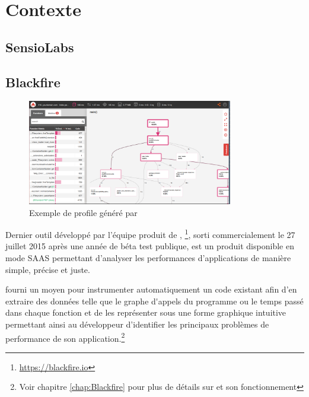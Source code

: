 \setcounter{part}{1}

\chapter{Contexte}
	\setcounter{chapter}{1}
	\section{SensioLabs}



	\section{Blackfire}

\begin{figure}[!h]
\begin{center}
    \includegraphics[width=0.8\textwidth]{images/blackfire-exemple}
  \caption{Exemple de profile généré par \Blackfire}
  \centering
\end{center}
\end{figure}

Dernier outil développé par l'équipe produit de \SensioLabs, \Blackfire\footnote{\url{https://blackfire.io}},
sorti commercialement le 27 juillet 2015 après une année de béta test publique, est un produit disponible en mode \gls{SAAS} permettant d'analyser les performances d'applications \PHP de manière simple, précise et juste.

\Blackfire fourni un moyen pour instrumenter automatiquement un code \PHP existant afin d'en extraire des données telle que le \gls{graphe d'appels} du programme ou le temps passé dans chaque fonction et de les représenter sous une forme graphique intuitive permettant ainsi au développeur d'identifier les principaux problèmes de performance de son application.\footnote{Voir chapitre \vref{chap:Blackfire} pour plus de détails sur \Blackfire et son fonctionnement}

